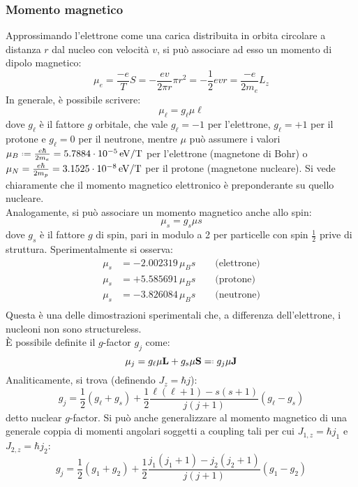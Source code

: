 \subsubsection{Momento magnetico}

Approssimando l'elettrone come una carica distribuita in orbita circolare a distanza $ r $ dal nucleo con velocità $ v $, si può associare ad esso un momento di dipolo magnetico:
\begin{equation}
	\mu_e = \frac{-e}{T} S = - \frac{ev}{2\pi r} \pi r^2 = - \frac{1}{2} e v r = \frac{-e}{2 m_e} L_z
	\label{eq:1.35}
\end{equation}
In generale, è possibile scrivere:
\begin{equation}
	\mu_{\ell} = g_{\ell} \mu \ell
	\label{eq:1.36}
\end{equation}
dove $ g_{\ell} $ è il fattore $ g $ orbitale, che vale $ g_{\ell} = -1 $ per l'elettrone, $ g_{\ell} = +1 $ per il protone e $ g_{\ell} = 0 $ per il neutrone, mentre $ \mu $ può assumere i valori $ \mu_B \defeq \frac{e\hbar}{2m_e} = 5.7884\cdot10^{-5}\ev/\text{T} $ per l'elettrone (magnetone di Bohr) o $ \mu_N = \frac{e\hbar}{2m_p} = 3.1525\cdot10^{-8}\,\mathrm{eV}/\text{T} $ per il protone (magnetone nucleare). Si vede chiaramente che il momento magnetico elettronico è preponderante su quello nucleare.\\
Analogamente, si può associare un momento magnetico anche allo spin:
\begin{equation}
	\mu_s = g_s \mu s
	\label{eq:1.37}
\end{equation}
dove $ g_s $ è il fattore $ g $ di spin, pari in modulo a 2 per particelle con spin $ \frac{1}{2} $ prive di struttura. Sperimentalmente si osserva:
\begin{align*}
	\mu_s &= -2.002319\, \mu_B s \qquad\text{(elettrone)} \\
	\mu_s &= +5.585691\, \mu_B s \qquad \text{(protone)} \\
	\mu_s &= -3.826084\, \mu_B s \qquad \text{(neutrone)} \\
\end{align*}
Questa è una delle dimostrazioni sperimentali che, a differenza dell'elettrone, i nucleoni non sono structureless.\\
È possibile definite il $ g $-factor $ g_j $ come:
\begin{equation}
	\ve{\mu}_j = g_{\ell} \mu \ve{L} + g_s \mu \ve{S} \eqdef g_j \mu \ve{J}
	\label{eq:1.38}
\end{equation}
Analiticamente, si trova (definendo $ J_z = \hbar j $):
\begin{equation}
	g_j = \frac{1}{2} \left( g_{\ell} + g_s \right) + \frac{1}{2} \frac{\ell (\ell + 1) - s (s + 1)}{j (j + 1)} \left( g_{\ell} - g_s \right)
	\label{eq:1.39}
\end{equation}
detto nuclear $ g $-factor. Si può anche generalizzare al momento magnetico di una generale coppia di momenti angolari soggetti a coupling tali per cui $ J_{1,z} = \hbar j_1 $ e $ J_{2,z} = \hbar j_2 $:
\begin{equation}
	g_j = \frac{1}{2} \left( g_1 + g_2 \right) + \frac{1}{2} \frac{j_1 (j_1 + 1) - j_2 (j_2 + 1)}{j (j + 1)} \left( g_1 - g_2 \right)
	\label{eq:1.40}
\end{equation}

